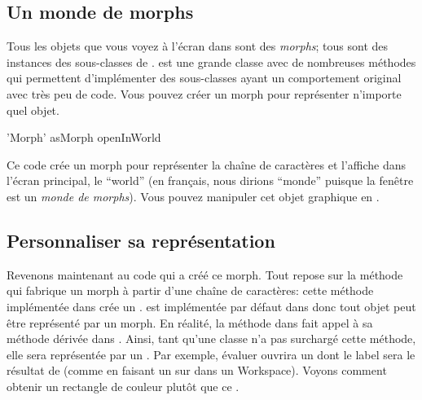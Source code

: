 \documentclass[a4paper,10pt,twoside]{book}
\begin{document}
\subsection{Un monde de morphs}
Tous les objets que vous voyez à l'écran dans \pharo sont des
\emph{morphs}; tous sont des instances des sous-classes de .
\mbox{} est une grande classe avec de nombreuses méthodes
qui permettent d'implémenter des sous-classes ayant un comportement
original avec très peu de code.
Vous pouvez créer un morph pour représenter n'importe quel objet. 


\begin{code}{}
'Morph' asMorph openInWorld
\end{code}

Ce code crée un morph pour représenter la chaîne
de caractères  et l'affiche dans
l'écran principal, le ``world'' (en français, nous dirions
``monde'' puisque la fenêtre \pharo est un \emph{monde de morphs}).
Vous pouvez manipuler cet objet graphique en \metaclickant{}.


\subsection{Personnaliser sa représentation}

Revenons maintenant au code qui a créé ce morph.%
Tout repose sur la méthode qui fabrique un morph à partir d'une
chaîne de caractères:
cette méthode  implémentée dans
 crée un .  est
implémentée par défaut dans  donc tout objet peut
être représenté par un morph. En réalité, la méthode
 dans  fait appel à sa méthode dérivée
dans . Ainsi, tant qu'une classe n'a pas surchargé cette
méthode, elle sera représentée par un .
Par exemple, évaluer  ouvrira un
 dont le label sera le résultat de 
 (comme en faisant un  sur 
dans un Workspace).
Voyons comment obtenir un rectangle de couleur plutôt que ce
.
\end{document}
